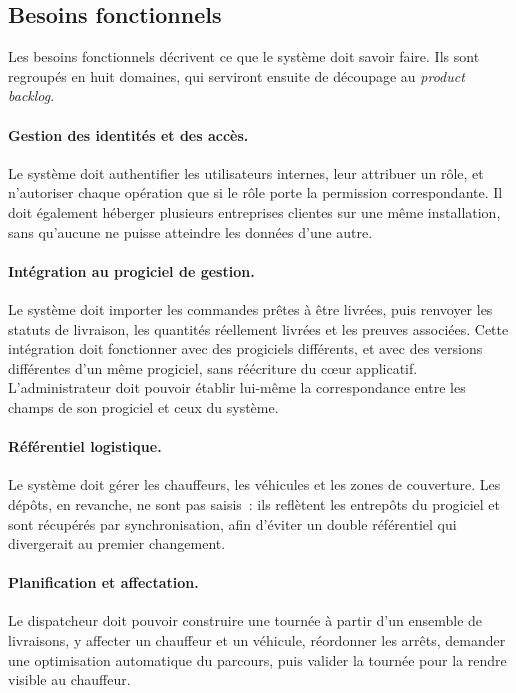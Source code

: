 \subsection{Besoins fonctionnels}

Les besoins fonctionnels décrivent ce que le système doit savoir faire. Ils sont regroupés en huit
domaines, qui serviront ensuite de découpage au \emph{product backlog}.

\paragraph*{Gestion des identités et des accès.} Le système doit authentifier les utilisateurs
internes, leur attribuer un rôle, et n'autoriser chaque opération que si le rôle porte la permission
correspondante. Il doit également héberger plusieurs entreprises clientes sur une même installation,
sans qu'aucune ne puisse atteindre les données d'une autre.

\paragraph*{Intégration au progiciel de gestion.} Le système doit importer les commandes prêtes à
être livrées, puis renvoyer les statuts de livraison, les quantités réellement livrées et les preuves
associées. Cette intégration doit fonctionner avec des progiciels différents, et avec des versions
différentes d'un même progiciel, sans réécriture du cœur applicatif. L'administrateur doit pouvoir
établir lui-même la correspondance entre les champs de son progiciel et ceux du système.

\paragraph*{Référentiel logistique.} Le système doit gérer les chauffeurs, les véhicules et les zones
de couverture. Les dépôts, en revanche, ne sont pas saisis~: ils reflètent les entrepôts du
progiciel et sont récupérés par synchronisation, afin d'éviter un double référentiel qui divergerait
au premier changement.

\paragraph*{Planification et affectation.} Le dispatcheur doit pouvoir construire une tournée à partir
d'un ensemble de livraisons, y affecter un chauffeur et un véhicule, réordonner les arrêts, demander
une optimisation automatique du parcours, puis valider la tournée pour la rendre visible au
chauffeur.

